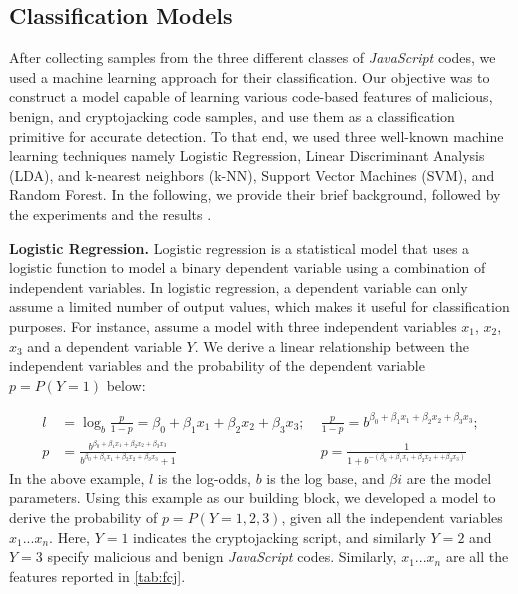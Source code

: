 \documentclass[acmlarge]{acmart}
\newcommand{\BfPara}[1]{{\noindent\bf#1.}\xspace\xspace}
\newcommand{\vs}[1]{{\vspace{-#1mm}}}
\newcommand{\js}{{\em JavaScript}\xspace}
\newcommand{\cj}{cryptojacking\xspace}
\begin{document}
\vs{0}
{\color{black}\subsection{Classification Models} \label{sec:clustering}
After collecting samples from the three different classes of \js codes, we used a machine learning approach for their classification. Our objective was to construct a model capable of learning various code-based features of malicious, benign, and \cj code samples, and use them as a classification primitive for accurate detection. To that end, we used three well-known machine learning techniques namely Logistic Regression, Linear Discriminant Analysis (LDA), and k-nearest neighbors (k-NN), Support Vector Machines (SVM), and Random Forest\cite{LiuCY09,NikitidisZP14}.  In the following, we provide their brief background, followed by the experiments and the results . 

\BfPara{Logistic Regression} Logistic regression is a statistical model that uses a logistic function to model a binary dependent variable using a combination of independent variables. In logistic regression, a dependent variable can only assume a limited number of output values, which makes it useful for classification purposes. For instance, assume a model with three independent variables $x_{1}$, $x_{2}$,$x_{3}$ and a dependent variable $Y$. We derive a linear relationship between the independent variables and the probability of the dependent variable $p =P(Y=1)$ below:

\begin{align}
  \nonumber l &= \log _{b} \frac{p}{1-p}=\beta_{0}+\beta_{1} x_{1}+\beta_{2} x_{2} +\beta_{3} x_{3};\;
  &\frac{p}{1-p}=b^{\beta_{0}+\beta_{1} x_{1}+\beta_{2} x_{2} +\beta_{3} x_{3}}; \\
  \nonumber p &= \frac{b^{\beta_{0}+\beta_{1} x_{1}+\beta_{2} x_{2} + \beta_{3} x_{3}}}{b^{\beta_{0}+\beta_{1} x_{1}+\beta_{2} x_{2}+ \beta_{3} x_{3}}+1} & p= \frac{1}{1+b^{-\left(\beta_{0}+\beta_{1} x_{1}+\beta_{2} x_{2}++\beta_{3} x_{3}\right)}}
\end{align}
In the above example, $l$ is the log-odds, $b$ is the log base, and $\beta{i}$ are the model parameters. Using this example as our building block, we developed a model to derive the probability of  $p = P(Y =1,2,3)$, given all the independent variables $x_{1}...x_{n}$. Here, $Y=1$ indicates the \cj script, and similarly $Y=2$ and $Y=3$ specify malicious and benign \js codes. Similarly, $x_{1}...x_{n}$ are all the features reported in \autoref{tab:fcj}. 

}
\end{document}
